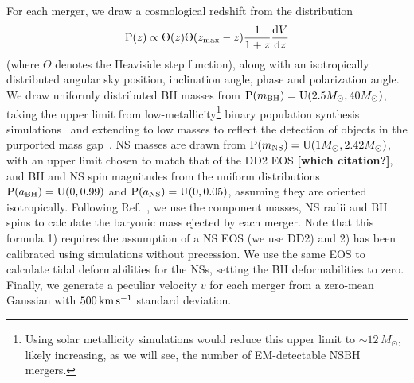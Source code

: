 \documentclass[%
 reprint,
 superscriptaddress,
 nofootinbib,
 amsmath,amssymb,
 aps,
]{revtex4-2}
\newcommand{\msun}{M_\odot}
\newcommand{\zmax}{\ensuremath{z_{\rm max}}}
\newcommand{\prob}{\ensuremath{{\rm P}}}
\newcommand{\abh}{a_{\rm BH}}
\newcommand{\ans}{a_{\rm NS}}
\newcommand{\mbh}{m_{\rm BH}}
\newcommand{\mns}{m_{\rm NS}}
\newcommand{\uniform}{{\rm U}}
\newcommand{\step}{\Theta}
\newcommand{\kms}{\ensuremath{{\rm km\,s^{-1}}}}
\begin{document}
For each merger, we draw a cosmological redshift from the distribution
\begin{equation}
\prob(z) \propto \step(z) \step(\zmax-z) \frac{1}{1+z} \frac{{\rm d}V}{{\rm d}z}
\end{equation}
(where $\step$ denotes the Heaviside step function), along with an isotropically distributed angular sky position, inclination angle, phase and polarization angle. We draw uniformly distributed BH masses from $\prob(\mbh) = \uniform(2.5\msun, 40\msun)$, taking the upper limit from low-metallicity\footnote{Using solar metallicity simulations would reduce this upper limit to $\sim12\,\msun$, likely increasing, as we will see, the number of EM-detectable NSBH mergers.}
binary population synthesis simulations~\cite{Kruckow_etal:2018} and extending to low masses to reflect the detection of objects in the purported mass gap~\cite{LVC:2020O3acat}. NS masses are drawn from $\prob(\mns) = \uniform(1\msun, 2.42\msun)$, with an upper limit chosen to match that of the DD2 EOS {\bf [which citation?]}, and BH and NS spin magnitudes from the uniform distributions $\prob(\abh) = \uniform(0, 0.99)$ and  $\prob(\ans) = \uniform(0, 0.05)$, assuming they are oriented isotropically. Following Ref.~\cite{Foucart_etal:2018}, we use the component masses, NS radii and BH spins to calculate the baryonic mass ejected by each merger. Note that this formula 1) requires the assumption of a NS EOS (we use DD2) and 2) has been calibrated using simulations without precession. We use the same EOS to calculate tidal deformabilities for the NSs, setting the BH deformabilities to zero. Finally, we generate a peculiar velocity $v$ for each merger from a zero-mean Gaussian with $500\,\kms$ standard deviation.
\end{document}
